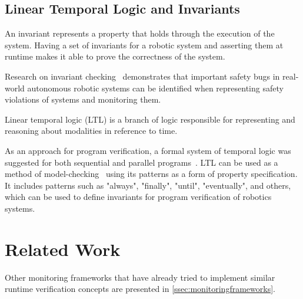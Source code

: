 

\subsection{Linear Temporal Logic and Invariants}
\label{ssec:ltlinvariants}

An invariant represents a property that holds through the execution of the system. Having a set of invariants for a robotic system and asserting them at runtime makes it able to prove the correctness of the system.

Research on invariant checking~\cite{zizyte2021importance} demonstrates that important safety bugs in real-world autonomous robotic systems can be identified when representing safety violations of systems and monitoring them.

Linear temporal logic (LTL) is a branch of logic responsible for representing and reasoning about modalities in reference to time. 

As an approach for program verification, a formal system of temporal logic was suggested for both sequential and parallel programs~\cite{pnueli1977temporal}. LTL can be used as a method of model-checking~\cite{dwyer1998property} using its patterns as a form of property specification. It includes patterns such as "always", "finally", "until", "eventually", and others, which can be used to define invariants for program verification of robotics systems.


\section{Related Work}
\label{sec:relatedwork}

 Other monitoring frameworks that have already tried to implement similar runtime verification concepts are presented in \autoref{ssec:monitoringframeworks}.

